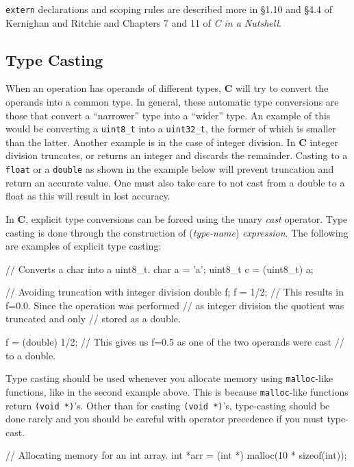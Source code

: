 \documentclass[11pt]{article}
\begin{document}
\texttt{extern} declarations and scoping rules are described more in \S 1.10 and
\S 4.4 of Kernighan and Ritchie and Chapters 7 and 11 of \emph{C in a Nutshell}.


\subsection{Type Casting}

When an operation has operands of different types, \textbf{C} will try to
convert the operands into a common type. In general, these automatic type
conversions are those that convert a ``narrower'' type into a ``wider'' type. An
example of this would be converting a \texttt{uint8\_t} into a
\texttt{uint32\_t}, the former of which is smaller than the latter. Another
example is in the case of integer division. In \textbf{C} integer division
truncates, or returns an integer and discards the remainder.  Casting to a
\texttt{float} or a \texttt{double} as shown in the example below will prevent
truncation and return an accurate value. One must also take care to not cast
from a double to a float as this will result in lost accuracy.

In \textbf{C}, explicit type conversions can be forced using the unary
\emph{cast} operator. Type casting is done through the construction of
(\emph{type-name}) \emph{expression}. The following are examples of explicit
type casting:

\begin{clisting}{}
// Converts a char into a uint8_t.
char a = 'a';
uint8_t c = (uint8_t) a;

// Avoiding truncation with integer division
double f;
f = 1/2;
// This results in f=0.0. Since the operation was performed
// as integer division the quotient was truncated and only
// stored as a double.

f = (double) 1/2;
// This gives us f=0.5 as one of the two operands were cast
// to a double.
\end{clisting}

Type casting should be used whenever you allocate memory using
\texttt{malloc}-like functions, like in the second example above. This is
because \texttt{malloc}-like functions return \texttt{(void *)}'s. Other than
for casting \texttt{(void *)}'s, type-casting should be done rarely and you
should be careful with operator precedence if you must type-cast.

\begin{clisting}{}
// Allocating memory for an int array.
int *arr = (int *) malloc(10 * sizeof(int));
\end{clisting}
\end{document}
